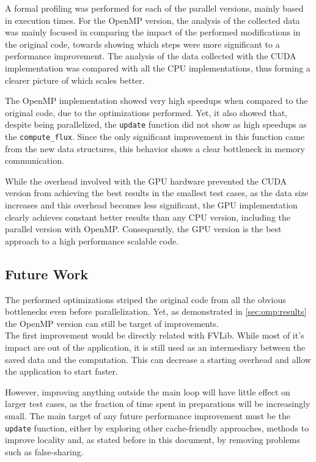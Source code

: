 \documentclass[9pt,twocolumn]{scrartcl}
\begin{document}
A formal profiling was performed for each of the parallel versions, mainly based in execution times. For the OpenMP version, the analysis of the collected data was mainly focused in comparing the impact of the performed modifications in the original code, towards showing which steps were more significant to a performance improvement. The analysis of the data collected with the CUDA implementation was compared with all the CPU implementations, thus forming a clearer picture of which scales better.

The OpenMP implementation showed very high speedups when compared to the original code, due to the optimizations performed. Yet, it also showed that, despite being parallelized, the \texttt{update} function did not show as high speedups as the \texttt{compute\_flux}. Since the only significant improvement in this function came from the new data structures, this behavior shows a clear bottleneck in memory communication.

While the overhead involved with the GPU hardware prevented the CUDA version from achieving the best results in the smallest test cases, as the data size increases and this overhead becomes less significant, the GPU implementation clearly achieves constant better results than any CPU version, including the parallel version with OpenMP. Consequently, the GPU version is the best approach to a high performance scalable code.

\subsection{Future Work}

The performed optimizations striped the original code from all the obvious bottlenecks even before parallelization. Yet, as demonstrated in \autoref{sec:omp:results} the OpenMP version can still be target of improvements.\\

The first improvement would be directly related with FVLib. While most of it's impact are out of the application, it is still used as an intermediary between the saved data and the computation. This can decrease a starting overhead and allow the application to start faster.

However, improving anything outside the main loop will have little effect on larger test cases, as the fraction of time spent in preparations will be increasingly small. The main target of any future performance improvement must be the \texttt{update} function, either by exploring other cache-friendly approaches, methods to improve locality and, as stated before in this document, by removing problems such as false-sharing.
\end{document}
